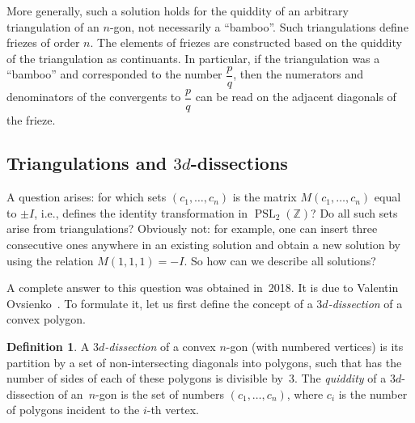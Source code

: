 \documentclass[a4paper,11pt]{amsart}
\newcommand{\ZZ}{{\mathbb{Z}}}
\newcommand{\PSL}{\mathop{\mathrm{PSL}}}
\theoremstyle{plain}
\newtheorem{theorem}{Theorem}[section]
\theoremstyle{remark}
\theoremstyle{definition}
\newtheorem{definition}[theorem]{Definition}
\newtheorem{exercise}[theorem]{Exercise}
\numberwithin{equation}{section}
\numberwithin{figure}{section}
\begin{document}
More generally, such a solution holds for the quiddity of an arbitrary triangulation of an $n$-gon, not necessarily a ``bamboo''. Such triangulations define friezes of order $n$. The elements of friezes are constructed based on the quiddity of the triangulation as continuants. In particular, if the triangulation was a ``bamboo'' and corresponded to the number $\dfrac pq$, then the numerators and denominators of the convergents to $\dfrac pq$ can be read on the adjacent diagonals of the frieze.

\subsection{Triangulations and $3d$-dissections} 

A question arises: for which sets $(c_1,\dots,c_n)$ is the matrix $M(c_1,\dots,c_n)$ equal to $\pm I$, i.e., defines the identity transformation in $\PSL_2(\ZZ)$? Do all such sets arise from triangulations? Obviously not: for example, one can insert three consecutive ones anywhere in an existing solution and obtain a new solution by using the relation $M(1,1,1)=-I$. So how can we describe all solutions?





A complete answer to this question was obtained in~2018. It is due to Valentin\,Ovsienko~\cite{Ovsienko18}. To formulate it, let us first define the concept of a \emph{$3d$-dissection} of a convex polygon.

\begin{definition}
A \emph{$3d$-dissection} of a convex $n$-gon (with numbered vertices) is its partition by a set of non-intersecting diagonals into polygons, such that has the number of sides of each of these polygons is divisible by~3. The \emph{quiddity} of a $3d$-dissection of an~$n$-gon is the set of numbers $(c_1,\dots,c_n)$, where $c_i$ is the number of polygons incident to the $i$-th vertex.
\end{definition}
\end{document}
